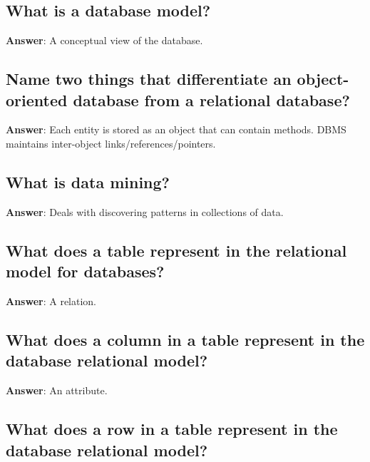 \documentclass[a4paper,11pt,oneside]{article}
\begin{document}
\begin{sloppypar}
\subsection{What is a database model?}

\label{q:290:sa:en:True}

\textbf{Answer}: A conceptual view of the database.



\subsection{Name two things that differentiate an object-oriented database from a relational database?}

\label{q:291:sa:en:True}

\textbf{Answer}: Each entity is stored as an object that can contain methods. DBMS maintains inter-object links/references/pointers.



\subsection{What is data mining?}

\label{q:292:sa:en:True}

\textbf{Answer}: Deals with discovering patterns in collections of data.



\subsection{What does a table represent in the relational model for databases?}

\label{q:293:sa:en:True}

\textbf{Answer}: A relation.



\subsection{What does a column in a table represent in the database relational model?}

\label{q:294:sa:en:True}

\textbf{Answer}: An attribute.



\subsection{What does a row in a table represent in the database relational model?}


\end{sloppypar}
\end{document}
